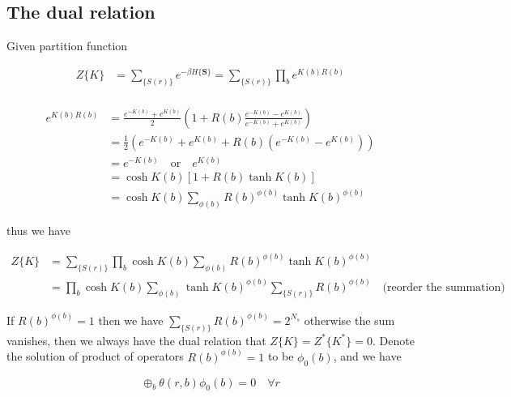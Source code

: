 \documentclass[11pt]{article}
\begin{document}
\subsection{The dual relation}

Given partition function

\begin{equation}
    \begin{aligned}
        Z\{K\} &= \sum_{\{S(r)\}} e^{-\beta H\{\mathbf{S}\}} = \sum_{\{S(r)\}} \prod_b e^{K(b) R(b)}\\
    \end{aligned}
\end{equation}

\begin{equation}
    \begin{aligned}
        e^{K(b)R(b)} &= \frac{e^{-K(b)} + e^{K(b)}}{2} (1 + R(b) \frac{e^{-K(b)} - e^{K(b)}}{e^{-K(b)} + e^{K(b)}})\\
        &= \frac{1}{2} (e^{-K(b)} + e^{K(b)} + R(b)(e^{-K(b)} - e^{K(b)}))\\
        &= e^{-K(b)} \quad \text{or} \quad e^{K(b)}\\
        &= \cosh{K(b)}[1 + R(b)\tanh{K(b)}]\\
        &= \cosh{K(b)}\sum_{\phi(b)} R(b)^{\phi(b)}\tanh{K(b)}^{\phi(b)}
    \end{aligned}
\end{equation}

thus we have

\begin{equation}
    \begin{aligned}
        Z\{K\} &= \sum_{\{S(r)\}} \prod_b \cosh{K(b)}\sum_{\phi(b)} R(b)^{\phi(b)}\tanh{K(b)}^{\phi(b)}\\
        &=\prod_b \cosh{K(b)} \sum_{\phi(b)} \tanh{K(b)}^{\phi(b)} \sum_{\{S(r)\}} R(b)^{\phi(b)} \quad \text{(reorder the summation)}
    \end{aligned}
\end{equation}

If $R(b)^{\phi(b)} = 1$ then we have $\sum_{\{S(r)\}} R(b)^{\phi(b)} = 2^{N_s}$ otherwise the sum vanishes, then
we always have the dual relation that $Z\{K\} = Z^{*}\{K^{*}\} = 0$.
Denote the solution of product of operators $R(b)^{\phi(b)} = 1$ to be $\phi_0(b)$, and we have

\begin{equation}
    \oplus_b \theta(r, b)\phi_0(b) = 0\quad \forall r
\end{equation}
\end{document}
